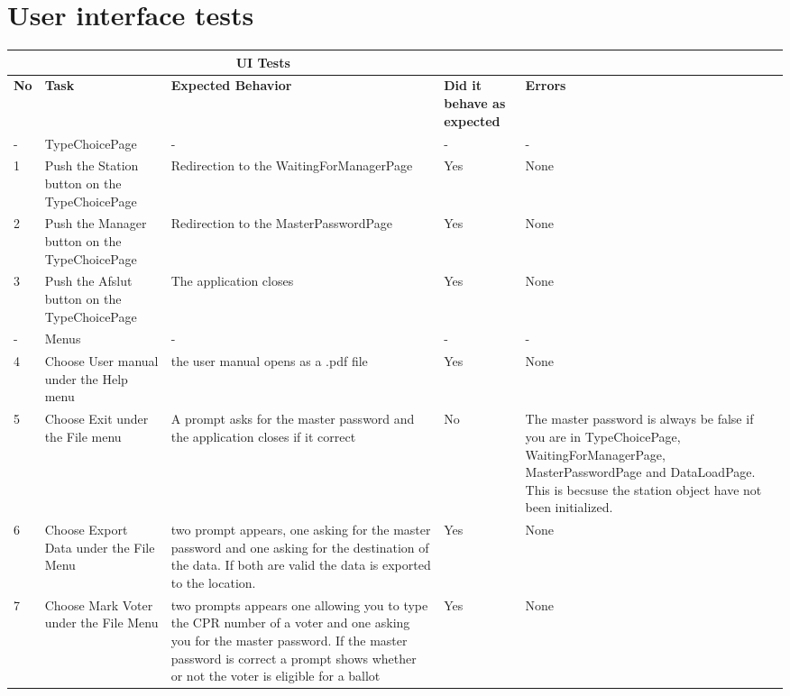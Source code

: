 \documentclass[a4paper]{report}
\begin{document}
\section{User interface tests}
\label{sec:uitests}
\noindent \begin{longtable}{|p{5mm}|p{}|p{}|p{}|p{}|}
\multicolumn{4}{c}{UI Tests}
\\\hline
\bf No & \bf Task & \bf Expected Behavior & \bf Did it behave as expected & \bf Errors

\\\hline
- & TypeChoicePage & - & - & - 

\\\hline
1 & Push the Station button on the TypeChoicePage & Redirection to the WaitingForManagerPage & Yes & None 

\\\hline
2 & Push the Manager button on the TypeChoicePage & Redirection to the MasterPasswordPage & Yes & None 

\\\hline
3 & Push the Afslut button on the TypeChoicePage & The application closes & Yes & None 

\\\hline
- & Menus & - & - & - 

\\\hline
4 &Choose User manual under the Help menu & the user manual opens as a .pdf file & Yes & None 

\\\hline
5 & Choose Exit under the File menu & A prompt asks for the master password and the application closes if it correct & No & The master password is always be false if you are in TypeChoicePage, WaitingForManagerPage, MasterPasswordPage and DataLoadPage. This is becsuse the station object have not been initialized.

 \\\hline
6 & Choose Export Data under the File Menu & two prompt appears, one asking for the master password and one asking for the destination of the data. If both are valid the data is exported to the location. & Yes & None 

 \\\hline
7 & Choose Mark Voter under the File Menu & two prompts appears one allowing you to type the CPR number of a voter and one asking you for the master password. If the master password is correct a prompt shows whether or not the voter is eligible for a ballot & Yes & None 


\end{longtable}
\end{document}
